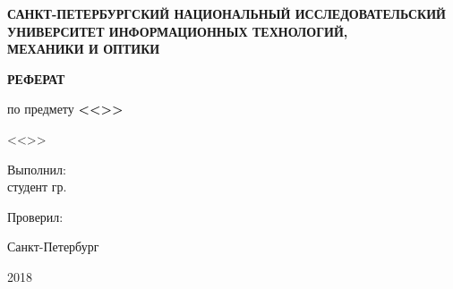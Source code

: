 \thispagestyle{empty}


\begin{center}
\textbf{САНКТ-ПЕТЕРБУРГСКИЙ НАЦИОНАЛЬНЫЙ ИССЛЕДОВАТЕЛЬСКИЙ\\ УНИВЕРСИТЕТ ИНФОРМАЦИОННЫХ ТЕХНОЛОГИЙ, \\МЕХАНИКИ И ОПТИКИ}
\end{center}


\vfill

\begin{center}
	\textbf{РЕФЕРАТ}
	
	по предмету \textbf{<<\Subject>>}
	
	<<\Theme>>
\end{center}

\vfill

\begin{flushright}
	Выполнил:\\
	студент гр. \Group
	
	Проверил:\\
	\Teacher
\end{flushright}

\vfill

\begin{center}
	Санкт-Петербург
	
	2018
\end{center}
